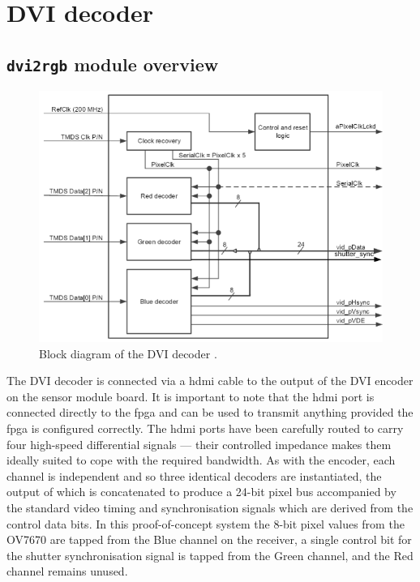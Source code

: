 \section{DVI decoder}

\subsection{\texttt{dvi2rgb} module overview}
\begin{figure}
  \centering
  \includegraphics[width=1\textwidth]{./img/dvi2rgb.png}\par
  \caption{Block diagram of the DVI decoder \cite{dvi2rgb}.}
  \label{fig:dvi2rgb}
\end{figure}

The DVI decoder is connected via a \gls{hdmi} cable to the output of the DVI encoder on the sensor module board. It is important to note that the \gls{hdmi} port is connected directly to the \gls{fpga} and can be used to transmit anything provided the \gls{fpga} is configured correctly. The \gls{hdmi} ports have been carefully routed to carry four high-speed differential signals --- their controlled impedance makes them ideally suited to cope with the required bandwidth. As with the encoder, each channel is independent and so three identical decoders are instantiated, the output of which is concatenated to produce a 24-bit pixel bus accompanied by the standard video timing and synchronisation signals which are derived from the control data bits. In this proof-of-concept system the 8-bit pixel values from the OV7670 are tapped from the Blue channel on the receiver, a single control bit for the shutter synchronisation signal is tapped from the Green channel, and the Red channel remains unused.

